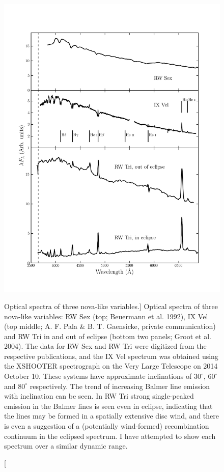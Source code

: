 \nocite{dhillon1996,hessman1984}
\begin{figure}
\centering
\includegraphics[width=1.0\textwidth, clip=true, trim= 0 0.6in 0 0.8in]{figures/01-intro/novalikes.png}
\caption
[Optical spectra of three nova-like variables.]
{
Optical spectra of three nova-like variables: 
RW Sex (top; Beuermann et al. 1992),
IX Vel (top middle; A. F. Pala \& B. T. Gaensicke, private communication) 
and RW Tri in and out of eclipse (bottom two panels; Groot et al. 2004).
The data for RW Sex and RW Tri were digitized from the respective publications,
and the IX Vel spectrum was obtained using the XSHOOTER spectrograph 
on the Very Large Telescope on 2014 October 10.
These systems have approximate inclinations of 
$30^\circ$, $60^\circ$ and $80^\circ$ respectively. 
The trend of increasing Balmer line emission with inclination can be seen.
In RW Tri strong single-peaked emission in the Balmer lines is seen even
in eclipse, indicating that the lines may be formed in a spatially
extensive disc wind, and there is even a suggestion 
of a (potentially wind-formed) recombination continuum in the eclipsed
spectrum. I have attempted to show each spectrum over a similar dynamic range.
} 
\label{fig:NL_spec}
\end{figure}

